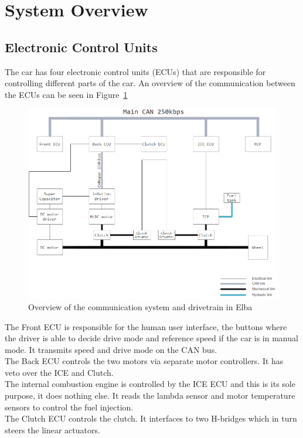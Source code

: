 \section{System Overview}
\subsection{Electronic Control Units}
The car has four electronic control units (ECUs) that are responsible for
controlling different parts of the car. An overview of the communication between
the ECUs can be seen in Figure~\ref{fig:communication_overview}
\begin{figure}[H]
    \centering
    \includegraphics[width=1\textwidth]{./img/elba_communication_overview}
    \caption{Overview of the communication system and drivetrain in
    Elba}\label{fig:communication_overview}
\end{figure}
The Front ECU is responsible for the human user interface, the buttons where the
driver is able to decide drive mode and reference speed if the car is in manual
mode. It transmits speed and drive mode on the CAN bus.\\
The Back ECU controls the two motors via separate motor controllers. It has
veto over the ICE and Clutch.\\
The internal combustion engine is controlled by the ICE ECU and this is its sole
purpose, it does nothing else. It reads the lambda sensor and motor
temperature sensors to control the fuel injection.\\
The Clutch ECU controls the clutch. It interfaces to two H-bridges which in turn
steers the linear actuators.  

